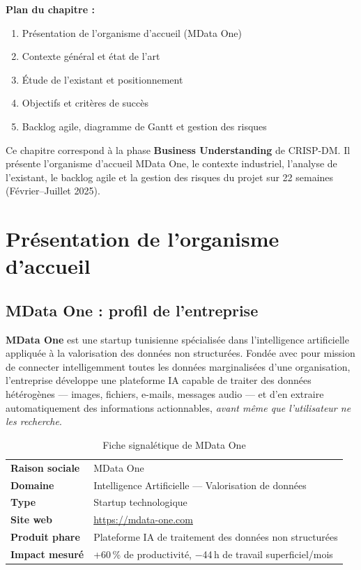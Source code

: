 \documentclass[12pt,a4paper,oneside]{report}
\newcommand{\theadrow}{\rowcolor{tekupblue!12}}
\newcommand{\chapterintro}[2]{%
  \begin{tcolorbox}[colback=tekupblue!4,colframe=tekupblue!40,
    boxrule=0.6pt,arc=4pt,left=10pt,right=10pt,top=6pt,bottom=6pt]
  \small\textbf{Plan du chapitre :}\\[3pt]#1
  \end{tcolorbox}
  \vspace{6pt}\noindent #2\vspace{10pt}
}
\begin{document}
\chapterintro{%
  \begin{enumerate}[noitemsep,leftmargin=*]
    \item Présentation de l'organisme d'accueil (MData One)
    \item Contexte général et état de l'art
    \item Étude de l'existant et positionnement
    \item Objectifs et critères de succès
    \item Backlog agile, diagramme de Gantt et gestion des risques
  \end{enumerate}
}{%
  Ce chapitre correspond à la phase \textbf{Business Understanding} de CRISP-DM.
  Il présente l'organisme d'accueil MData One, le contexte industriel,
  l'analyse de l'existant, le backlog agile et la gestion des risques
  du projet sur 22 semaines (Février--Juillet 2025).
}

\section{Présentation de l'organisme d'accueil}
\label{sec:organisme}

\subsection{MData One : profil de l'entreprise}

\textbf{MData One} est une startup tunisienne spécialisée dans
l'intelligence artificielle appliquée à la valorisation des données
non structurées. Fondée avec pour mission de connecter intelligemment
toutes les données marginalisées d'une organisation, l'entreprise
développe une plateforme IA capable de traiter des données hétérogènes
--- images, fichiers, e-mails, messages audio --- et d'en extraire
automatiquement des informations actionnables, \textit{avant même que
l'utilisateur ne les recherche}.

\begin{table}[H]
\centering
\caption{Fiche signalétique de MData One}
\label{tab:mdata}
\begin{tabularx}{\linewidth}{@{}lX@{}}
\toprule
\theadrow
\textbf{Raison sociale}  & MData One \\
\textbf{Domaine}         & Intelligence Artificielle --- Valorisation de données \\
\textbf{Type}            & Startup technologique \\
\textbf{Site web}        & \url{https://mdata-one.com} \\
\textbf{Produit phare}   & Plateforme IA de traitement des données non structurées \\
\textbf{Impact mesuré}   & +60\,\% de productivité, $-$44\,h de travail superficiel/mois \\
\bottomrule
\end{tabularx}
\end{table}
\end{document}
